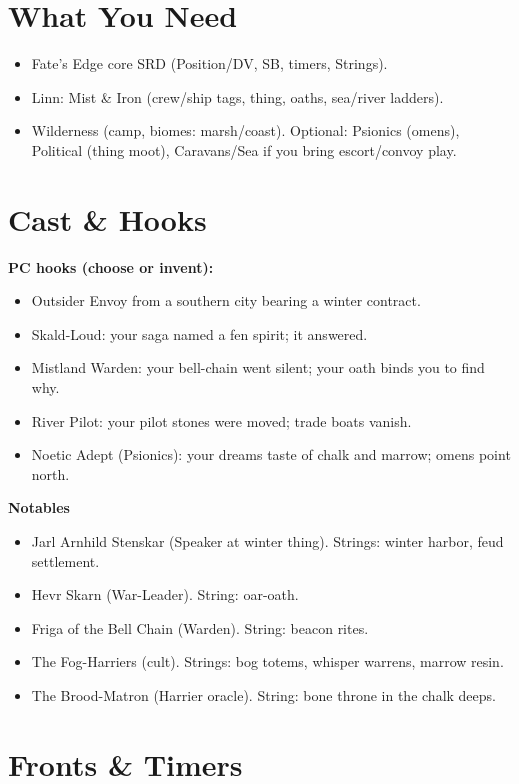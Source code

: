 \documentclass[11pt]{article}
\begin{document}
\section*{What You Need}
\begin{itemize}
\item Fate's Edge core SRD (Position/DV, SB, timers, Strings).
\item Linn: Mist \& Iron (crew/ship tags, thing, oaths, sea/river ladders).
\item Wilderness (camp, biomes: marsh/coast). Optional: Psionics (omens), Political (thing moot), Caravans/Sea if you bring escort/convoy play.
\end{itemize}

\section{Cast \& Hooks}

\textbf{PC hooks (choose or invent):}
\begin{itemize}
\item Outsider Envoy from a southern city bearing a winter contract.
\item Skald-Loud: your saga named a fen spirit; it answered.
\item Mistland Warden: your bell-chain went silent; your oath binds you to find why.
\item River Pilot: your pilot stones were moved; trade boats vanish.
\item Noetic Adept (Psionics): your dreams taste of chalk and marrow; omens point north.
\end{itemize}

\textbf{Notables}
\begin{itemize}
\item Jarl Arnhild Stenskar (Speaker at winter thing). Strings: winter harbor, feud settlement.
\item Hevr Skarn (War-Leader). String: oar-oath.
\item Friga of the Bell Chain (Warden). String: beacon rites.
\item The Fog-Harriers (cult). Strings: bog totems, whisper warrens, marrow resin.
\item The Brood-Matron (Harrier oracle). String: bone throne in the chalk deeps.
\end{itemize}

\section{Fronts \& Timers}
\end{document}
